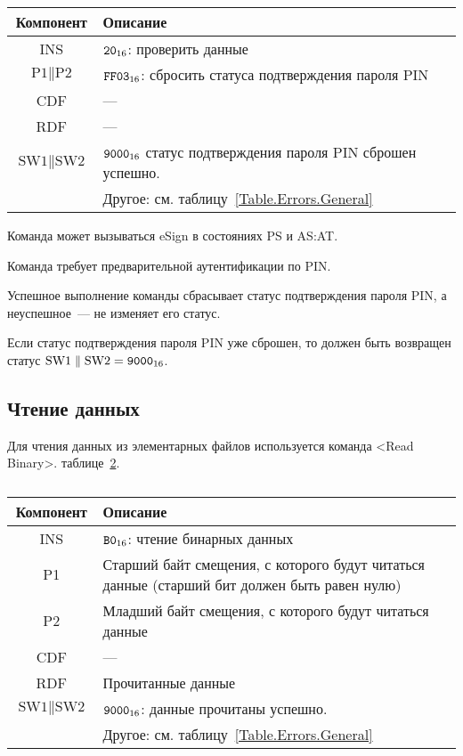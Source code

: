 \begin{table}[hbt]
\caption{}\label{Table.Oper.VerifyDeauthCmd}
\begin{tabular}{|c|p{14cm}|}
\hline
Компонент & Описание \\
\hline
\hline
INS & $\texttt{20}_{16}$: проверить данные\\
\hline
$\text{P1} \parallel \text{P2}$ & $\texttt{FF03}_{16}$: сбросить статуса подтверждения
пароля PIN  \\
\hline
CDF & ---  \\
\hline 
RDF &  --- \\
\hline
$\text{SW1} \parallel \text{SW2}$ & $\texttt{9000}_{16}$ 
статус подтверждения пароля PIN сброшен успешно.\\
& Другое: см. таблицу~\ref{Table.Errors.General} \\
\hline
\end{tabular}
\end{table}

Команда может вызываться  eSign  
в состояниях PS и AS:AT.

Команда требует предварительной аутентификации по PIN.

Успешное выполнение команды сбрасывает статус подтверждения пароля PIN,
а неуспешное~--- не изменяет его статус.

Если статус подтверждения пароля PIN уже сброшен, то должен быть возвращен статус
$\text{SW1} \parallel \text{SW2} = \texttt{9000}_{16}$.

\subsection{Чтение данных}
\label{Oper.Descr.Read}

Для чтения данных из элементарных файлов используется команда <Read Binary>.
 таблице~\ref{Table.Oper.ReadCmd}.

\begin{table}[hbt]
\caption{}\label{Table.Oper.ReadCmd}
\begin{tabular}{|c|p{14cm}|}
\hline
Компонент & Описание \\
\hline
\hline
INS & $\texttt{B0}_{16}$: чтение бинарных данных \\
\hline
P1 & Старший байт смещения, с которого будут читаться данные (старший бит 
должен быть равен нулю) \\
\hline
P2 & Младший байт смещения, с которого будут читаться данные\\
\hline
CDF &  --- \\
\hline 
RDF & 	Прочитанные данные \\
\hline
$\text{SW1} \parallel\text{SW2}$ & 
$\texttt{9000}_{16}$: данные прочитаны успешно. \\
& Другое: см. таблицу~\ref{Table.Errors.General} \\
\hline
\end{tabular}
\end{table}

